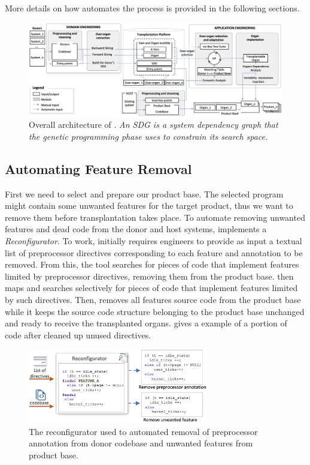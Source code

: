 More details on how \prodscalpel automates the \FOUNDRY process is provided in the following sections.

\begin{figure}[t]
	\centering  \includegraphics[width=\textwidth]{images/PRODSCALPEL_ARCHITECTURE.png}
	\centering \caption{Overall architecture of \prodscalpel. \textit{An SDG is a system dependency graph that the genetic programming phase uses to constrain its search space.}
 }
	\label{fig:prodscalpel}
\end{figure} 

\subsection{Automating Feature Removal}

First we need to select and prepare our product base. The selected program might contain some unwanted features for the target product, thus we want to remove them before transplantation takes place. To automate removing unwanted features and dead code from the donor and host systems, \prodscalpel  implements a  \emph{Reconfigurator}. To work, \prodscalpel initially requires engineers to provide as input a textual list of preprocessor directives corresponding to each feature and annotation to be removed. From this, the tool searches for pieces of code that implement features limited by preprocessor directives, removing them from the product base. \prodscalpel then maps and searches selectively for pieces of code that implement features limited by such directives. Then, \prodscalpel removes all features source code from the product base while it keeps the source code structure belonging to the product base unchanged and ready to receive the transplanted organs.  gives a example of a portion of code after \prodscalpel cleaned up unused directives. 

\begin{figure}[t]
	\centering \includegraphics[width=0.7\textwidth]{images/reconfigurator2.png}
	\centering 
	\caption{The reconfigurator used to automated removal of preprocessor annotation from donor codebase and unwanted features from product base.}
	\label{fig:reconfigurator}
\end{figure} 

